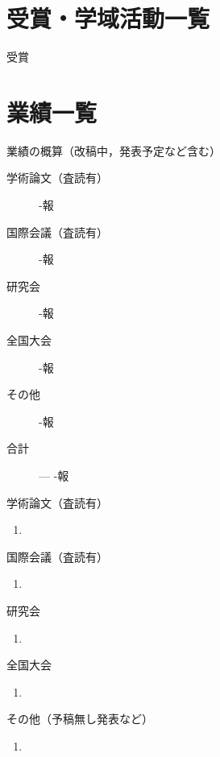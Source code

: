 \chapter*{受賞・学域活動一覧}

受賞
\begin{description}
   \item 
\end{description}

\chapter*{業績一覧}

業績の概算（改稿中，発表予定など含む）
\begin{description}
   \item[学術論文（査読有）] -報
   \item[国際会議（査読有）] -報
   \item[研究会] -報
   \item[全国大会] -報
   \item[その他] -報
   \item[合計] --- -報
\end{description}

学術論文（査読有）
\begin{enumerate}
   \item 
\end{enumerate}

国際会議（査読有）
\begin{enumerate}
   \item 
\end{enumerate}

研究会
\begin{enumerate}
   \item 
\end{enumerate}

全国大会
\begin{enumerate}
   \item 
\end{enumerate}

その他（予稿無し発表など）
\begin{enumerate}
   \item 
\end{enumerate}
